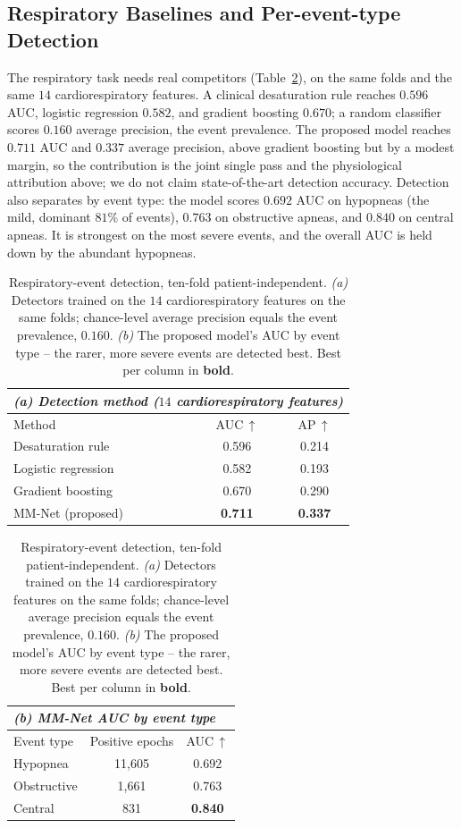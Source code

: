 \documentclass[preprint,12pt]{elsarticle}
\newcommand{\mmAuc}{0.711}
\newcommand{\mmAp}{0.337}
\begin{document}
\subsection{Respiratory Baselines and Per-event-type Detection}
The respiratory task needs real competitors (Table~\ref{tab:resp}), on the same folds and the same $14$
cardiorespiratory features. A clinical desaturation rule reaches $0.596$ AUC, logistic
regression $0.582$, and gradient boosting $0.670$; a random classifier scores $0.160$ average
precision, the event prevalence. The proposed model reaches $\mmAuc$ AUC and $\mmAp$ average
precision, above gradient boosting but by a modest margin, so the contribution is the joint
single pass and the physiological attribution above; we do not claim state-of-the-art
detection accuracy. Detection also separates by event type: the model scores $0.692$ AUC on hypopneas (the
mild, dominant $81\%$ of events), $0.763$ on obstructive apneas, and $0.840$ on central apneas.
It is strongest on the most severe events, and the overall AUC is held down by the abundant
hypopneas.

\begin{table}[t]
\caption{Respiratory-event detection, ten-fold patient-independent. \textit{(a)} Detectors trained
on the $14$ cardiorespiratory features on the same folds; chance-level average precision equals the
event prevalence, $0.160$. \textit{(b)} The proposed model's AUC by event type -- the rarer, more
severe events are detected best. Best per column in \textbf{bold}.}
\label{tab:resp}
\centering
\small
\begin{tabular}{lcc}
\toprule
\multicolumn{3}{l}{\textit{(a) Detection method ($14$ cardiorespiratory features)}}\\
\midrule
Method & AUC\,$\uparrow$ & AP\,$\uparrow$ \\
\midrule
Desaturation rule    & 0.596 & 0.214 \\
Logistic regression  & 0.582 & 0.193 \\
Gradient boosting    & 0.670 & 0.290 \\
MM-Net (proposed)    & \textbf{0.711} & \textbf{0.337} \\
\bottomrule
\end{tabular}

\vspace{4pt}
\begin{tabular}{lcc}
\toprule
\multicolumn{3}{l}{\textit{(b) MM-Net AUC by event type}}\\
\midrule
Event type & Positive epochs & AUC\,$\uparrow$ \\
\midrule
Hypopnea    & 11{,}605 & 0.692 \\
Obstructive & 1{,}661  & 0.763 \\
Central     & 831      & \textbf{0.840} \\
\bottomrule
\end{tabular}
\end{table}
\end{document}
